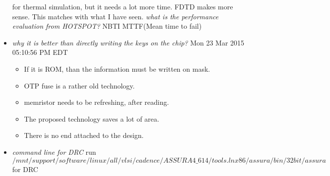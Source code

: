 \documentclass[]{article}
\newcommand{\solved}[1]{{\color{blue}\textit{#1}}}
\begin{document}
\begin{itemize}
                for thermal simulation, but it needs a lot more time. FDTD makes
                more sense. This matches with what I have seen. \solved{what is
                the performance evaluation from HOTSPOT?} NBTI MTTF(Mean time to
                fail)
                \item \solved{why it is better than directly writing the keys on
                the chip?} Mon 23 Mar 2015 05:10:56 PM EDT 
                    \begin{itemize}
                        \item If it is ROM, than the information must be written on
                        mask.
                        \item OTP fuse is a rather old technology.
                        \item memristor needs to be refreshing, after reading.
                        \item The proposed technology saves a lot of area.
                        \item There is no end attached to the design.
                    \end{itemize}
                \item \solved{command line for DRC} run
                \begin{equation}
                /mnt/support/software/linux/all/vlsi/cadence/ASSURA4\_614/tools.lnx86/assura/bin/32bit/assura
                \end{equation}
                for DRC

                
        \end{itemize}
\end{document}

